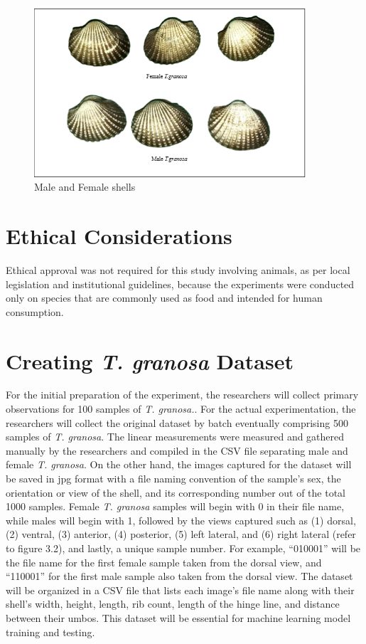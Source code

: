 \begin{figure}[!htbp]
	\centering
	\includegraphics[width=0.9\textwidth]{figures/male-female T.granosa.png}
	\caption{Male and Female \Tegillarcagranosa shells}
\end{figure}

\section{Ethical Considerations}
\label{sec:ethical}

Ethical approval was not required for this study involving animals, as per local legislation and institutional guidelines, because the experiments were conducted only on species that are commonly used as food and intended for human consumption. 


\section{Creating \textit{T. granosa} Dataset}
\label{sec:dataset}

For the initial preparation of the experiment, the researchers will collect primary observations for 100 samples of \textit{T. granosa.}. For the actual experimentation, the researchers will collect the original dataset by batch eventually comprising 500 samples of \textit{T. granosa}. The linear measurements were measured and gathered manually by the researchers and compiled in the CSV file separating male and female \textit{T. granosa}. On the other hand, the images captured for the dataset will be saved in jpg format with a file naming convention of the sample’s sex, the orientation or view of the shell, and its corresponding number out of the total 1000 samples. Female \textit{T. granosa} samples will begin with 0 in their file name, while males will begin with 1, followed by the views captured such as (1) dorsal, (2) ventral, (3) anterior, (4) posterior, (5) left lateral, and (6) right lateral (refer to figure 3.2), and lastly, a unique sample number. For example, “010001” will be the file name for the first female sample taken from the dorsal view, and “110001” for the first male sample also taken from the dorsal view. The dataset will be organized in a CSV file that lists each image’s file name along with their shell’s width, height, length, rib count, length of the hinge line, and distance between their umbos. This dataset will be essential for machine learning model training and testing. 


